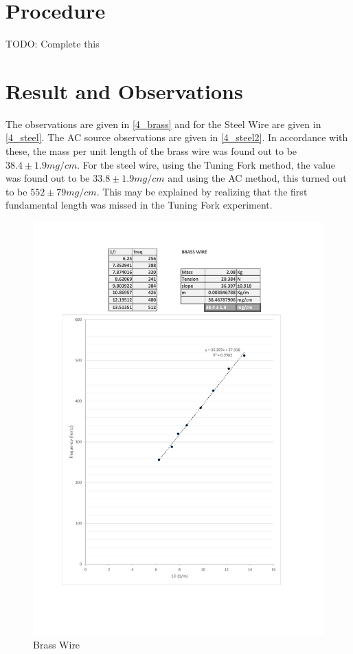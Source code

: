 \section{Procedure}
	TODO: Complete this
	
\section{Result and Observations}
	The observations are given in \autoref{4_brass} and for the Steel Wire are given in \autoref{4_steel}. The AC source observations are given in \autoref{4_steel2}. In accordance with these, the mass per unit length of the brass wire was found out to be $38.4 \pm 1.9 mg/cm$. For the steel wire, using the Tuning Fork method, the value was found out to be $33.8 \pm 1.9 mg/cm$ and using the AC method, this turned out to be $552 \pm 79 mg/cm$. This may be explained by realizing that the first fundamental length was missed in the Tuning Fork experiment.
	\begin{figure}[bth]
		\begin{center}
			\includegraphics[width=1.3\linewidth]{gfx/brass}
		\end{center}
		\caption[Brass Wire]{Brass Wire}
	\label{4_brass}
	\end{figure}

